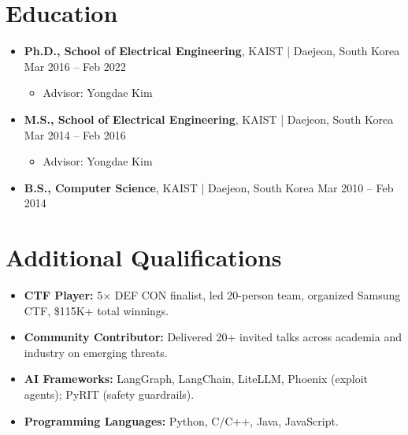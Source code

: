 \documentclass[11pt,letterpaper]{article}
\newcommand{\jobtitle}[1]{\textbf{#1}}
\newcommand{\location}[1]{\textcolor{secondary}{\small #1}}
\newcommand{\daterange}[1]{\textcolor{secondary}{\small #1}}
\begin{document}
\section{Education}
\begin{itemize}[]
\item \jobtitle{Ph.D., School of Electrical Engineering}, \location{KAIST | Daejeon, South Korea} \hfill \daterange{Mar 2016 -- Feb 2022}
    \begin{itemize}[] %
    \item Advisor: Yongdae Kim
    \end{itemize}
\item \jobtitle{M.S., School of Electrical Engineering}, \location{KAIST | Daejeon, South Korea} \hfill \daterange{Mar 2014 -- Feb 2016}
    \begin{itemize}[] %
    \item Advisor: Yongdae Kim
    \end{itemize}
\item \jobtitle{B.S., Computer Science}, \location{KAIST | Daejeon, South Korea} \hfill \daterange{Mar 2010 -- Feb 2014}
\end{itemize}

\section{Additional Qualifications}
\begin{itemize}[itemsep=3pt]

\item \textbf{CTF Player:}
    5× DEF CON finalist, led 20-person team, organized Samsung CTF, \$115K+ total winnings.
\item \textbf{Community Contributor:}
    Delivered 20+ invited talks across academia and industry on emerging threats.
\item \textbf{AI Frameworks:} LangGraph, LangChain, LiteLLM, Phoenix (exploit agents); PyRIT (safety guardrails).
\item \textbf{Programming Languages:} Python, C/C++, Java, JavaScript.
\end{itemize}
\end{document}
